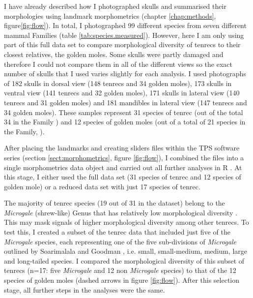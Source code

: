 	I have already described how I photographed skulls and summarised their morphologies using landmark morphometrics (chapter \ref{chap:methods}, figure\ref{fig:flow}). In total, I photographed 99 different species from seven different mammal Families (table \ref{tab:species.measured}). However, here I am only using part of this full data set to compare morphological diversity of tenrecs to their closest relatives, the golden moles. Some skulls were partly damaged and therefore I could not compare them in all of the different views so the exact number of skulls that I used varies slightly for each analysis. I used photographs of 182 skulls in dorsal view (148 tenrecs and 34 golden moles), 173 skulls in ventral view (141 tenrecs and 32 golden moles), 171 skulls in lateral view (140 tenrecs and 31 golden moles) and 181 mandibles in lateral view (147 tenrecs and 34 golden moles). These samples represent 31 species of tenrec (out of the total 34 in the Family \citep{Olson2013}) and 12 species of golden moles (out of a total of 21 species in the Family, \citep{Asher2010}).
	

	After placing the landmarks and creating sliders files within the TPS software series (section \ref{sect:morphometrics}, figure \ref{fig:flow}), I combined the files into a single morphometrics data object and carried out all further analyses in R \citep{Team2014}. At this stage, I either used the full data set (31 species of tenrec and 12 species of golden mole) or a reduced data set with just 17 species of tenrec. 
	
	The majority of tenrec species (19 out of 31 in the dataset) belong to the \textit{Microgale} (shrew-like) Genus that has relatively low morphological diversity \citep{Soarimalala2011, Jenkins2003}. This may mask signals of higher morphological diversity among other tenrecs. To test this, I created a subset of the tenrec data that included just five of the \textit{Microgale} species, each representing one of the five sub-divisions of \textit{Microgale} outlined by Soarimalala and Goodman \citeyearpar{Soarimalala2011}, i.e. small, small-medium, medium, large and long-tailed species. I compared the morphological diversity of this subset of tenrecs (n=17: five \textit{Microgale} and 12 non \textit{Microgale} species) to that of the 12 species of golden moles (dashed arrows in figure \ref{fig:flow}). After this selection stage, all further steps in the analyses were the same.
	
